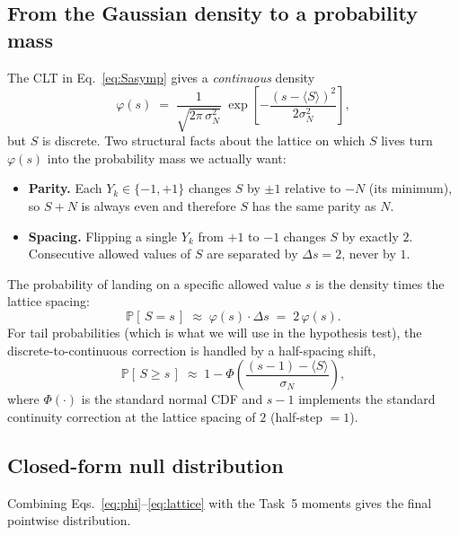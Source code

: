 \documentclass[11pt,a4paper]{article}
\renewcommand{\Pr}{\mathbb{P}}
\begin{document}
\subsection{From the Gaussian density to a probability mass}
\label{sec:lattice}
The CLT in Eq.~\eqref{eq:Sasymp} gives a \emph{continuous} density
\begin{equation}
  \varphi(s)
  \;=\;
  \frac{1}{\sqrt{2\pi\,\sigma_N^2}}\;
  \exp\!\left[-\frac{(s - \langle S\rangle)^2}{2\sigma_N^2}\right],
  \label{eq:phi}
\end{equation}
but $S$ is discrete. Two structural facts about the lattice on which
$S$ lives turn $\varphi(s)$ into the probability mass we actually
want:
\begin{itemize}[leftmargin=2em,nosep]
  \item \textbf{Parity.} Each $Y_k \in \{-1,+1\}$ changes $S$ by $\pm 1$
        relative to $-N$ (its minimum), so $S + N$ is always even and
        therefore $S$ has the same parity as $N$.
  \item \textbf{Spacing.} Flipping a single $Y_k$ from $+1$ to $-1$
        changes $S$ by exactly $2$. Consecutive allowed values of $S$
        are separated by $\Delta s = 2$, never by $1$.
\end{itemize}
The probability of landing on a specific allowed value $s$ is the
density times the lattice spacing:
\begin{equation}
  \Pr[\,S = s\,] \;\approx\; \varphi(s)\cdot\Delta s
                       \;=\; 2\,\varphi(s).
  \label{eq:lattice}
\end{equation}
For tail probabilities (which is what we will use in the hypothesis
test), the discrete-to-continuous correction is handled by a
half-spacing shift,
\begin{equation}
  \Pr[\,S \geq s\,]
  \;\approx\;
  1 - \Phi\!\left(\frac{(s-1) - \langle S\rangle}{\sigma_N}\right),
  \label{eq:continuity}
\end{equation}
where $\Phi(\cdot)$ is the standard normal CDF and $s-1$ implements
the standard continuity correction at the lattice spacing of $2$
(half-step $= 1$).

\subsection{Closed-form null distribution}
Combining Eqs.~\eqref{eq:phi}--\eqref{eq:lattice} with the Task~5
moments gives the final pointwise distribution.
\end{document}
